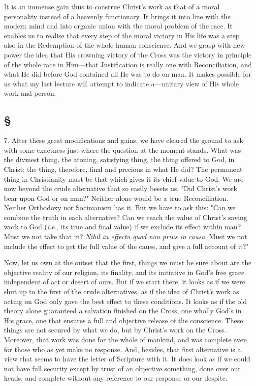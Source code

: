 \documentclass[draft]{ptfdoc}
\begin{document}
It is an immense gain thus to construe 
Christ's work as that of a moral personality 
instead of a heavenly functionary. It brings 
it into line with the modern mind and into 
organic union with the moral problem of 
the race. It enables us to realise that every 
step of the moral victory in His life was a step 
also in the Redemption of the whole human 
conscience. And we grasp with new power the 
idea that His crowning victory of the Cross was 
the victory in principle of the whole race in 
Him---that Justification is really one with Reconciliation, 
and what He did before God contained 
all He was to do on man. It makes 
possible for us what my last lecture will attempt 
to indicate a---unitary view of His whole work 
and person. 

\subsection*{
\S
}

7. After these great modifications and gains, 
we have cleared the ground to ask with some 
exactness just where the question at the moment 
stands. What was the divinest thing, the atoning, 
satisfying thing, the thing offered to God, in 
Christ; the thing, therefore, final and precious in 
what He did? The permanent thing in Christianity 
must be that which gives it its chief 
value to God. We are now beyond the crude 
alternative that so easily besets us, "Did Christ's 
work bear upon God or on man?" Neither alone 
would be a true Reconciliation. Neither Orthodoxy 
nor Socinianism has it. But we have to ask 
this: "Can we combine the truth in each alternative? 
Can we reach the value of Christ's 
saving work to God (\textit{i.e.}, its true and final value) 
if we exclude its effect within man? Must we 
not take that in? \textit{Nihil in effectu quod non prius 
in causa}. Must we not include the effect to get 
the full value of the cause, and give a full 
account of it?" 

Now, let us own at the outset that the first, 
things we must be sure about are the objective 
reality of our religion, its finality, and its initiative 
in God's free grace independent of act or 
desert of ours. But if we start there, it looks 
as if we were shut up to the first of the crude 
alternatives, as if the idea of Christ's work as 
acting on God only gave the best effect to these 
conditions. It looks as if the old theory alone 
guaranteed a salvation finished on the Cross, one 
wholly God's in His grace, one that ensures a 
full and objective release of the conscience. 
These things are not secured by what we do, but 
by Christ's work on the Cross. Moreover, that 
work was done for the whole of mankind, and 
was complete even for those who as yet make no 
response. And, besides, that first alternative is 
a view that seems to have the letter of Scripture 
with it. It does look as if we could not have full 
security except by trust of an objective something, 
done over our heads, and complete without 
any reference to our response or our 
despite. 
\end{document}
